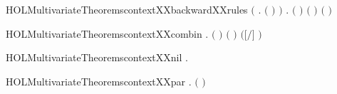 \begin{SaveVerbatim}{HOLMultivariateTheoremscontextXXbackwardXXrules}
   \ensuremath{(}\HOLSymConst{\HOLTokenForall{}}  .   \ensuremath{(}  \ensuremath{)} \HOLSymConst{\HOLTokenImp{}}   \ensuremath{)} \HOLSymConst{\HOLTokenConj{}}
   \HOLSymConst{\HOLTokenForall{}}  .
         \ensuremath{(}  \ensuremath{)} \HOLSymConst{\HOLTokenImp{}}  \ensuremath{(}   \ensuremath{)} \ensuremath{(} \ensuremath{)}
\end{SaveVerbatim}
\newcommand{\HOLMultivariateTheoremscontextXXbackwardXXrules}{\UseVerbatim{HOLMultivariateTheoremscontextXXbackwardXXrules}}
\begin{SaveVerbatim}{HOLMultivariateTheoremscontextXXcombin}
\HOLTokenTurnstile{} \HOLSymConst{\HOLTokenForall{}}  .
         \HOLSymConst{\HOLTokenConj{}}    \HOLSymConst{\HOLTokenConj{}}  \ensuremath{(} \ensuremath{)}  \HOLSymConst{\HOLTokenConj{}}
       \ensuremath{(}  \HOLSymConst{\ensuremath{=}}  \ensuremath{)} \HOLSymConst{\HOLTokenImp{}}
         \ensuremath{(}\ensuremath{[}\ensuremath{/}\ensuremath{]} \ensuremath{)}
\end{SaveVerbatim}
\newcommand{\HOLMultivariateTheoremscontextXXcombin}{\UseVerbatim{HOLMultivariateTheoremscontextXXcombin}}
\begin{SaveVerbatim}{HOLMultivariateTheoremscontextXXnil}
\HOLTokenTurnstile{} \HOLSymConst{\HOLTokenForall{}}.   
\end{SaveVerbatim}
\newcommand{\HOLMultivariateTheoremscontextXXnil}{\UseVerbatim{HOLMultivariateTheoremscontextXXnil}}
\begin{SaveVerbatim}{HOLMultivariateTheoremscontextXXpar}
\HOLTokenTurnstile{} \HOLSymConst{\HOLTokenForall{}}  .
         \ensuremath{(} \HOLSymConst{\ensuremath{\mid}} \ensuremath{)} \HOLSymConst{\HOLTokenImp{}}    \HOLSymConst{\HOLTokenConj{}}   
\end{SaveVerbatim}
